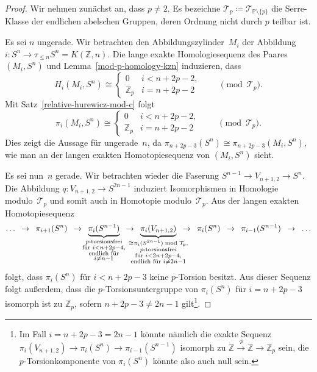 \documentclass[11pt, a4paper, german]{article}
\theoremstyle{definition}
\theoremstyle{remark}
\newcommand{\R}{\mathbb{R}} %
\newcommand{\Z}{\mathbb{Z}} %
\newcommand{\T}{\mathcal{T}} %
\newcommand{\V}[2]{V_{{#2},{#1}}} %
\newcommand{\Primes}{\mathbb{P}} %
\begin{document}
\begin{proof}
  Wir nehmen zunächst an, dass $p \neq 2$.
  Es bezeichne $\T_p \coloneqq \T_{\Primes \setminus \{ p \}}$ die Serre-Klasse der endlichen abelschen Gruppen, deren Ordnung nicht durch $p$ teilbar ist.

  Es sei $n$ ungerade.
  Wir betrachten den Abbildungszylinder~$M_i$ der Abbildung $i : S^n \to \tau_{\leq n} S^n = K(\Z, n)$.
  Die lange exakte Homologiesequenz des Paares $(M_i, S^n)$ und Lemma~\ref{mod-p-homology-kzn} induzieren, dass
  \[
   H_i(M_i, S^n) \cong \begin{cases}
     0 & i < n + 2p - 2, \\
     \Z_p & i = n + 2p - 2
   \end{cases}
   \qquad \pmod{\T_p}.
  \]
  Mit Satz~\ref{relative-hurewicz-mod-c} folgt
  \[
   \pi_i(M_i, S^n) \cong \begin{cases}
     0 & i < n + 2p - 2, \\
     \Z_p & i = n + 2p - 2
   \end{cases}
   \qquad \pmod{\T_p}.
  \]
  Dies zeigt die Aussage für ungerade~$n$, da $\pi_{n+2p-3}(S^n) \cong \pi_{n+2p-3}(M_i, S^n)$, wie man an der langen exakten Homotopiesequenz von $(M_i, S^n)$ sieht.

  Es sei nun~$n$ gerade.
  Wir betrachten wieder die Faserung $S^{n-1} \to \V{2}{n+1} \to S^n$.
  Die Abbildung $q : \V{2}{n+1} \to S^{2n-1}$ induziert Isomorphismen in Homologie modulo~$\T_p$ und somit auch in Homotopie modulo~$\T_p$.
  Aus der langen exakten Homotopiesequenz
  \[
    \ldots
    \enspace\to\enspace
    \pi_{i+1}(S^n)
    \enspace\to\enspace
    \underbrace{\pi_i(S^{n-1})}_{\mathclap{\substack{\text{$p$-torsionsfrei} \\ \text{für } i < n + 2p - 4, \\ \text{endlich für} \\ i \neq n-1}}}
    \enspace\to\enspace \underbrace{\pi_i(\V{2}{n+1})}_{\mathclap{\substack{\cong \pi_i(S^{2n-1}) \bmod{\T_p}, \\ \text{$p$-torsionsfrei} \\ \text{für } i < 2n + 2p - 4, \\ \text{endlich für } i \neq 2n-1}}}
    \enspace\to\enspace
    \pi_i(S^n)
    \enspace\to\enspace
    \pi_{i-1}(S^{n-1})
    \enspace\to\enspace
    \ldots
  \]
  folgt, dass $\pi_i(S^n)$ für $i < n + 2p - 3$ keine $p$-Torsion besitzt.
  Aus dieser Sequenz folgt außerdem, dass die $p$-Torsionsuntergruppe von $\pi_i(S^n)$ für $i = n + 2p - 3$ isomorph ist zu $\Z_p$, sofern $n + 2p - 3 \neq 2n - 1$ gilt\footnote{Im Fall $i = n + 2p - 3 = 2n - 1$ könnte nämlich die exakte Sequenz $\pi_i(\V{2}{n+1}) \to \pi_i(S^n) \to \pi_{i-1}(S^{n-1})$ isomorph zu $\Z \xrightarrow{\cdot p} \Z \to \Z_p$ sein, die $p$-Torsionkomponente von $\pi_i(S^n)$ könnte also auch null sein.}.
  

\end{proof}
\end{document}
